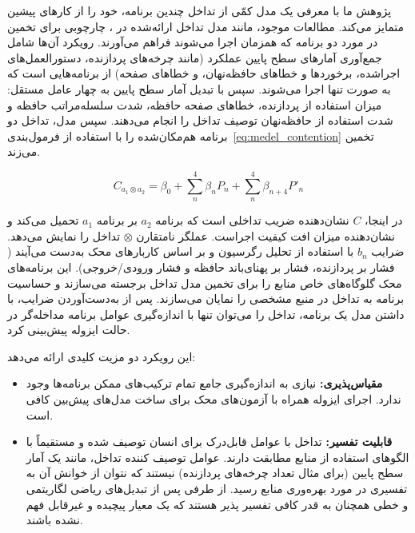 پژوهش ما با معرفی یک مدل کمّی از تداخل چندین برنامه، خود را از کارهای پیشین متمایز می‌کند. مطالعات موجود، مانند مدل تداخل ارائه‌شده در \cite{medel2023modeling}، چارچوبی برای تخمین در مورد دو برنامه که همزمان اجرا می‌شوند فراهم می‌آورند. رویکرد آن‌ها شامل جمع‌آوری آمارهای سطح پایین عملکرد (مانند چرخه‌های پردازنده، دستورالعمل‌های اجراشده، برخوردها و خطاهای حافظه‌نهان، و خطاهای صفحه) از برنامه‌هایی است که به صورت تنها اجرا می‌شوند. سپس با تبدیل آمار سطح پایین به چهار عامل مستقل: میزان استفاده از پردازنده، خطاهای صفحه حافظه، شدت سلسله‌مراتب حافظه و شدت استفاده از حافظه‌نهان توصیف تداخل را انجام می‌دهند. سپس مدل، تداخل دو برنامه هم‌مکان‌شده را با استفاده از فرمول‌بندی~\eqref{eq:medel_contention} تخمین می‌زند.

\begin{equation} \label{eq:medel_contention}
    C_{a_1 \otimes a_2} = \beta_0 + \sum_n^4 \beta_n P_n + \sum_n^4 \beta_{n+4}P'_n
\end{equation}

در اینجا، $C$ نشان‌دهنده ضریب تداخلی است که برنامه $a_2$ بر برنامه $a_1$ تحمیل می‌کند و نشان‌دهنده میزان افت کیفیت اجراست. عملگر نامتقارن $\otimes$ تداخل را نمایش می‌دهد. ضرایب $b_n$ با استفاده از تحلیل رگرسیون و بر اساس کاربارهای محک به‌دست می‌آیند ( فشار بر پردازنده،  فشار بر پهنای‌باند حافظه و  فشار ورودی/خروجی). این برنامه‌های محک گلوگاه‌های خاص منابع را برای تخمین مدل تداخل برجسته می‌سازند و حساسیت برنامه به تداخل در منبع مشخصی را نمایان می‌سازند. پس از به‌دست‌آوردن ضرایب، با داشتن مدل یک برنامه، تداخل را می‌توان تنها با اندازه‌گیری عوامل برنامه مداخله‌گر در حالت ایزوله پیش‌بینی کرد.

این رویکرد دو مزیت کلیدی ارائه می‌دهد:

\begin{itemize}
\item
\textbf{مقیاس‌پذیری:} نیازی به اندازه‌گیری جامع تمام ترکیب‌های ممکن برنامه‌ها وجود ندارد. اجرای ایزوله همراه با آزمون‌های محک برای ساخت مدل‌های پیش‌بین کافی است.
\item
\textbf{قابلیت تفسیر:} تداخل با عوامل قابل‌درک برای انسان توصیف شده و مستقیماً با الگوهای استفاده از منابع مطابقت دارند. عوامل توصیف کننده تداخل، مانند یک آمار سطح پایین (برای مثال تعداد چرخه‌های پردازنده) نیستند که نتوان از خوانش آن به تفسیری در مورد بهره‌وری منابع رسید. از طرفی پس از تبدیل‌های ریاضی لگاریتمی و خطی همچنان به قدر کافی تفسیر پذیر هستند که یک معیار پیچیده و غیرقابل فهم نشده باشند.
\end{itemize}

